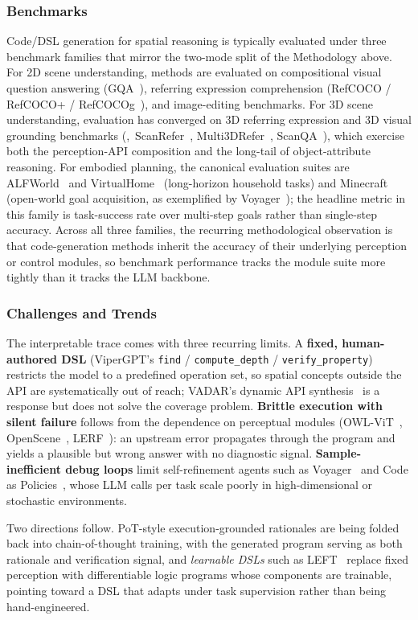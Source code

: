 \subsubsection{Benchmarks}
Code/DSL generation for spatial reasoning is typically evaluated under three benchmark families that mirror the two-mode split of the Methodology above. For 2D scene understanding, methods are evaluated on compositional visual question answering (GQA~\cite{hudson2019gqa}), referring expression comprehension (RefCOCO / RefCOCO+ / RefCOCOg~\cite{yu2016modeling,mao2016generation,kazemzadeh2014referitgame}), and image-editing benchmarks. For 3D scene understanding, evaluation has converged on 3D referring expression and 3D visual grounding benchmarks (\eg,\ ScanRefer~\cite{chen2020scanrefer}, Multi3DRefer~\cite{zhang2023multi3drefer}, ScanQA~\cite{azuma2022scanqa}), which exercise both the perception-API composition and the long-tail of object-attribute reasoning. For embodied planning, the canonical evaluation suites are ALFWorld~\cite{shridhar2020alfworld} and VirtualHome~\cite{puig2018virtualhome} (long-horizon household tasks) and Minecraft (open-world goal acquisition, as exemplified by Voyager~\cite{wang2023voyager}); the headline metric in this family is task-success rate over multi-step goals rather than single-step accuracy. Across all three families, the recurring methodological observation is that code-generation methods inherit the accuracy of their underlying perception or control modules, so benchmark performance tracks the module suite more tightly than it tracks the LLM backbone.

\subsubsection{Challenges and Trends}
The interpretable trace comes with three recurring limits.
A \textbf{fixed, human-authored DSL} (ViperGPT's \texttt{find} / \texttt{compute\_depth} / \texttt{verify\_property}) restricts the model to a predefined operation set, so spatial concepts outside the API are systematically out of reach; VADAR's dynamic API synthesis~\cite{marsili2025visual} is a response but does not solve the coverage problem.
\textbf{Brittle execution with silent failure} follows from the dependence on perceptual modules (OWL-ViT~\cite{minderer2022simple}, OpenScene~\cite{peng2023openscene}, LERF~\cite{kerr2023lerf}): an upstream error propagates through the program and yields a plausible but wrong answer with no diagnostic signal.
\textbf{Sample-inefficient debug loops} limit self-refinement agents such as Voyager~\cite{wang2023voyager} and Code as Policies~\cite{liang2023code}, whose LLM calls per task scale poorly in high-dimensional or stochastic environments.

Two directions follow.
PoT-style execution-grounded rationales are being folded back into chain-of-thought training, with the generated program serving as both rationale and verification signal, and \emph{learnable DSLs} such as LEFT~\cite{hsu2023s} replace fixed perception with differentiable logic programs whose components are trainable, pointing toward a DSL that adapts under task supervision rather than being hand-engineered.
